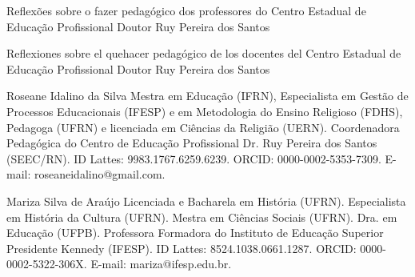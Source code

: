 \begin{refsection}
    \renewcommand{\thefigure}{\arabic{figure}}
    
    \chapterOneLine
    {Reflexões sobre o fazer pedagógico dos professores do Centro Estadual de Educação Profissional Doutor Ruy Pereira dos Santos}
    \label{chap:reflexao-fazer-pedagogico}

    \begin{otherlanguage}{spanish}

        \fakeChapterOneLine
        {Reflexiones sobre el quehacer pedagógico de los docentes del Centro Estadual de Educação Profissional Doutor Ruy Pereira dos Santos}
    
    \end{otherlanguage}

    \articleAuthor
    {Roseane Idalino da Silva}
    {Mestra em Educação (IFRN), Especialista em Gestão de Processos Educacionais (IFESP) e em Metodologia do Ensino Religioso (FDHS), Pedagoga (UFRN) e licenciada em Ciências da Religião (UERN). Coordenadora Pedagógica do Centro de Educação Profissional Dr. Ruy Pereira dos Santos (SEEC/RN). ID Lattes: 9983.1767.6259.6239. ORCID: 0000-0002-5353-7309. E-mail: roseaneidalino@gmail.com.}
    
    \articleAuthor
    {Mariza Silva de Araújo}
    {Licenciada e Bacharela em História (UFRN). Especialista em História da Cultura (UFRN). Mestra em Ciências Sociais (UFRN). Dra. em Educação (UFPB). Professora Formadora do Instituto de Educação Superior Presidente Kennedy (IFESP). ID Lattes: 8524.1038.0661.1287. ORCID: 0000-0002-5322-306X. E-mail: mariza@ifesp.edu.br.}
    

\end{refsection}
